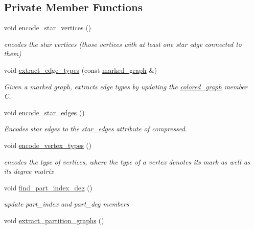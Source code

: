 \subsection*{Private Member Functions}
\begin{DoxyCompactItemize}
\item 
void \hyperlink{classmarked__graph__encoder_af8daeed1452dbfd41fa2f875813e3496}{encode\+\_\+star\+\_\+vertices} ()
\begin{DoxyCompactList}\small\item\em encodes the star vertices (those vertices with at least one star edge connected to them) \end{DoxyCompactList}\item 
void \hyperlink{classmarked__graph__encoder_ac3060e8f7e6abbe371c5968eb47cb8a1}{extract\+\_\+edge\+\_\+types} (const \hyperlink{classmarked__graph}{marked\+\_\+graph} \&)
\begin{DoxyCompactList}\small\item\em Given a marked graph, extracts edge types by updating the \hyperlink{classcolored__graph}{colored\+\_\+graph} member C. \end{DoxyCompactList}\item 
void \hyperlink{classmarked__graph__encoder_ad6883669a47d24e3d9898978f3252727}{encode\+\_\+star\+\_\+edges} ()
\begin{DoxyCompactList}\small\item\em Encodes star edges to the star\+\_\+edges attribute of compressed. \end{DoxyCompactList}\item 
void \hyperlink{classmarked__graph__encoder_a239769085214166e09cb56de750a8d71}{encode\+\_\+vertex\+\_\+types} ()
\begin{DoxyCompactList}\small\item\em encodes the type of vertices, where the type of a vertex denotes its mark as well as its degree matrix \end{DoxyCompactList}\item 
void \hyperlink{classmarked__graph__encoder_a1cb2cd754108302a0437a924dc70bc0e}{find\+\_\+part\+\_\+index\+\_\+deg} ()
\begin{DoxyCompactList}\small\item\em update part\+\_\+index and part\+\_\+deg members \end{DoxyCompactList}\item 
void \hyperlink{classmarked__graph__encoder_a60b0038c57bd8fa2f5cb3f0b6999c4f3}{extract\+\_\+partition\+\_\+graphs} ()

\end{DoxyCompactItemize}
